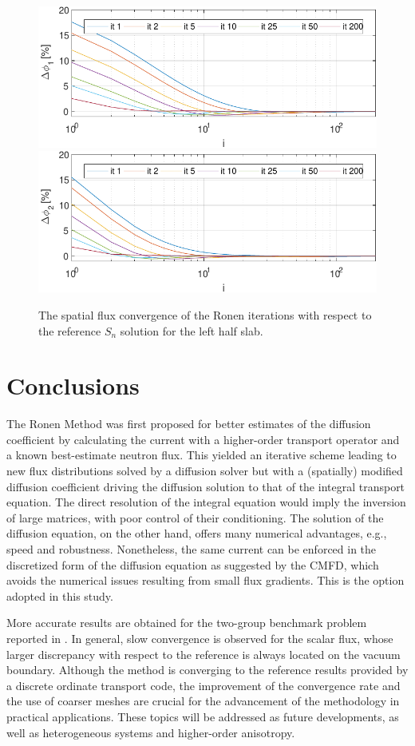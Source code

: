 \begin{figure}[htbp!]
	\centering
	\includegraphics[width=0.45\linewidth]{flux_deviation_half_it_1_sn.pdf}
	\includegraphics[width=0.45\linewidth]{flux_deviation_half_it_2_sn.pdf}
	\caption{The spatial flux convergence of the Ronen iterations with respect to the reference $S_n$ solution for the left half slab.}
	\label{fig:conv3}
\end{figure}

%
\section{Conclusions}
\label{sec:conc}

The Ronen Method was first proposed for better estimates of the diffusion coefficient by calculating the current with a higher-order transport operator and a known best-estimate neutron flux. This yielded an iterative scheme leading to new flux distributions solved by a diffusion solver but with a (spatially) modified diffusion coefficient driving the diffusion solution to that of the integral transport equation. The direct resolution of the integral equation would imply the inversion of large matrices, with poor control of their conditioning. The solution of the diffusion equation, on the other hand, offers many numerical advantages, e.g., speed and robustness. Nonetheless, the same current can be enforced in the discretized form of the diffusion equation as suggested by the CMFD, which avoids the numerical issues resulting from small flux gradients. This is the option adopted in this study.  

More accurate results are obtained for the two-group benchmark problem reported in \cite{Tomatis-2011}. In general, slow convergence is observed for the scalar flux, whose larger discrepancy with respect to the reference is always located on the vacuum boundary. Although the method is converging to the reference results provided by a discrete ordinate transport code, the improvement of the convergence rate and the use of coarser meshes are crucial for the advancement of the methodology in practical applications. These topics will be addressed as future developments, as well as heterogeneous systems and higher-order anisotropy.

